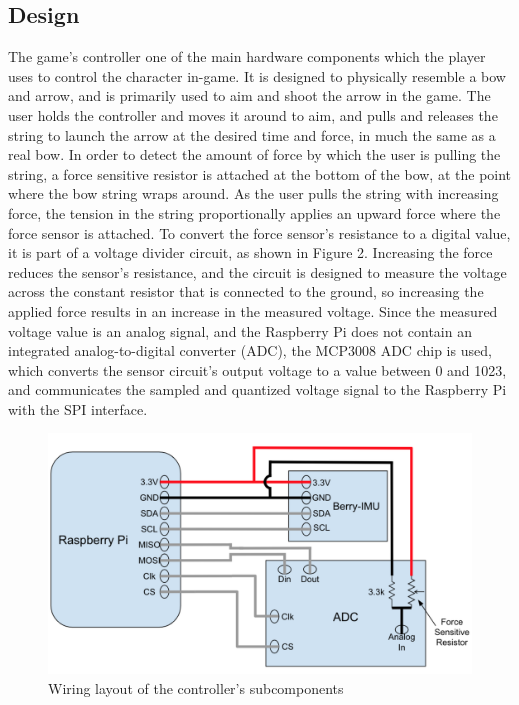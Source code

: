 \documentclass[titlepage, 12pt]{scrartcl}
\begin{document}
    \subsection{Design}
     The game's controller one of the main hardware components which the player uses to control the character in-game. It is designed to physically resemble a bow and arrow, and is primarily used to aim and shoot the arrow in the game. The user holds the controller and moves it around to aim, and pulls and releases the string to launch the arrow at the desired time and force, in much the same as a real bow. In order to detect the amount of force by which the user is pulling the string, a force sensitive resistor is attached at the bottom of the bow, at the point where the bow string wraps around. As the user pulls the string with increasing force, the tension in the string proportionally applies an upward force where the force sensor is attached. To convert the force sensor's resistance to a digital value, it is part of a voltage divider circuit, as shown in Figure 2. Increasing the force reduces the sensor's resistance, and the circuit is designed to measure the voltage across the constant resistor that is connected to the ground, so increasing the applied force results in an increase in the measured voltage. Since the measured voltage value is an analog signal, and the Raspberry Pi does not contain an integrated analog-to-digital converter (ADC), the MCP3008 ADC chip is used, which converts the sensor circuit's output voltage to a value between 0 and 1023, and communicates the sampled and quantized voltage signal to the Raspberry Pi with the SPI interface. \par
    \begin{figure}
        \centering
        \includegraphics[width=\textwidth]{figures/controller_circuit.png}
        \caption{Wiring layout of the controller's subcomponents}
        \label{fig:circuit}
    \end{figure}
\end{document}
